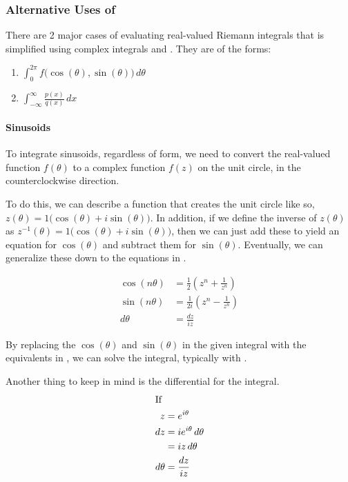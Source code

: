 \subsubsection{Alternative Uses of }\label{subsubsec:Alternative_Uses_Cauchys_Residue_Theorem}
There are 2 major cases of evaluating real-valued Riemann integrals that is simplified using complex integrals and .
They are of the forms:
\begin{enumerate}[noitemsep]
\item $\int_{0}^{2\pi} f \bigl( \cos(\theta), \sin(\theta) \bigr) \, d\theta$
\item $\int_{-\infty}^{\infty} \frac{p(x)}{q(x)} \, dx$
\end{enumerate}

\paragraph{Sinusoids}\label{par:Sinusoids_Cauchys_Residue_Theorem}
To integrate sinusoids, regardless of form, we need to convert the real-valued function $f(\theta)$ to a complex function $f(z)$ on the unit circle, in the counterclockwise direction.

To do this, we can describe a function that creates the unit circle like so, $z(\theta) = 1 \bigl( \cos(\theta) + i \sin(\theta) \bigr)$.
In addition, if we define the inverse of $z(\theta)$ as $z^{-1}(\theta) = 1 \bigl( \cos(\theta) + i \sin(\theta) \bigr)$, then we can just add these to yield an equation for $\cos(\theta)$ and subtract them for $\sin(\theta)$.
Eventually, we can generalize these down to the equations in .

\begin{equation}\label{eq:Real_to_Imaginary_Sinusoids}
  \begin{aligned}
    \cos(n \theta) &= \frac{1}{2} \left( z^{n} + \frac{1}{z^{n}} \right) \\
    \sin(n \theta) &= \frac{1}{2i} \left( z^{n} - \frac{1}{z^{n}} \right) \\
    d\theta &= \frac{dz}{i z}
  \end{aligned}
\end{equation}

By replacing the $\cos(\theta)$ and $\sin(\theta)$ in the given integral with the equivalents in , we can solve the integral, typically with .

Another thing to keep in mind is the differential for the integral.
\begin{align*}
  \shortintertext{If}
  z &= e^{i \theta} \\
  dz &= i e^{i \theta} \, d\theta \\
    &= i z \, d\theta \\
  d\theta &= \frac{dz}{i z}
\end{align*}

